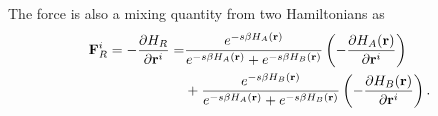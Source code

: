 
The force is also a mixing quantity from two Hamiltonians as
\begin{align}
	\mathbf{F}_R^i=-\frac{\partial H_R}{\partial \mathbf{r}^i}=&\frac{e^{-s\beta H_A(\mathbf{r})}}{e^{-s\beta H_A(\mathbf{r})}+e^{-s\beta H_B(\mathbf{r})}}\left(-\frac{\partial H_A(\mathbf{r})}{\partial \mathbf{r}^i}\right)\notag\\
	&+\frac{e^{-s\beta H_B(\mathbf{r})}}{e^{-s\beta H_A(\mathbf{r})}+e^{-s\beta H_B(\mathbf{r})}}\left(-\frac{\partial H_B(\mathbf{r})}{\partial \mathbf{r}^i}\right).
\end{align}

